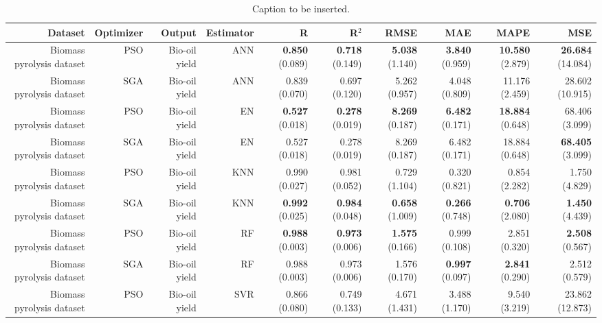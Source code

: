 \begin{table}
\centering
\caption{Caption to be inserted.}
\label{eml___comparison_datasets_table}
\begin{tabular}{rrrrrrrrrr}
\toprule
                  Dataset & Optimizer &        Output & Estimator &                    R &                R$^2$ &                 RMSE &                  MAE &                  MAPE &                    MSE \\
\midrule
Biomass pyrolysis dataset &       PSO & Bio-oil yield &       ANN & { \bf 0.850} (0.089) & { \bf 0.718} (0.149) & { \bf 5.038} (1.140) & { \bf 3.840} (0.959) & { \bf 10.580} (2.879) & { \bf 26.684} (14.084) \\
Biomass pyrolysis dataset &       SGA & Bio-oil yield &       ANN &        0.839 (0.070) &        0.697 (0.120) &        5.262 (0.957) &        4.048 (0.809) &        11.176 (2.459) &        28.602 (10.915) \\
Biomass pyrolysis dataset &       PSO & Bio-oil yield &        EN & { \bf 0.527} (0.018) & { \bf 0.278} (0.019) & { \bf 8.269} (0.187) & { \bf 6.482} (0.171) & { \bf 18.884} (0.648) &         68.406 (3.099) \\
Biomass pyrolysis dataset &       SGA & Bio-oil yield &        EN &        0.527 (0.018) &        0.278 (0.019) &        8.269 (0.187) &        6.482 (0.171) &        18.884 (0.648) &  { \bf 68.405} (3.099) \\
Biomass pyrolysis dataset &       PSO & Bio-oil yield &       KNN &        0.990 (0.027) &        0.981 (0.052) &        0.729 (1.104) &        0.320 (0.821) &         0.854 (2.282) &          1.750 (4.829) \\
Biomass pyrolysis dataset &       SGA & Bio-oil yield &       KNN & { \bf 0.992} (0.025) & { \bf 0.984} (0.048) & { \bf 0.658} (1.009) & { \bf 0.266} (0.748) &  { \bf 0.706} (2.080) &   { \bf 1.450} (4.439) \\
Biomass pyrolysis dataset &       PSO & Bio-oil yield &        RF & { \bf 0.988} (0.003) & { \bf 0.973} (0.006) & { \bf 1.575} (0.166) &        0.999 (0.108) &         2.851 (0.320) &   { \bf 2.508} (0.567) \\
Biomass pyrolysis dataset &       SGA & Bio-oil yield &        RF &        0.988 (0.003) &        0.973 (0.006) &        1.576 (0.170) & { \bf 0.997} (0.097) &  { \bf 2.841} (0.290) &          2.512 (0.579) \\
Biomass pyrolysis dataset &       PSO & Bio-oil yield &       SVR &        0.866 (0.080) &        0.749 (0.133) &        4.671 (1.431) &        3.488 (1.170) &         9.540 (3.219) &        23.862 (12.873) \\

\end{tabular}
\end{table}
